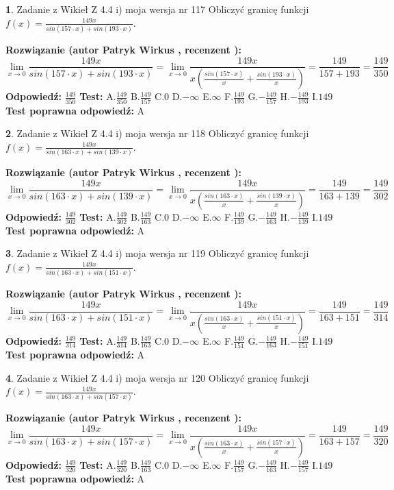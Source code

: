 \documentclass[12pt, a4paper]{article}
\theoremstyle{definition} %
\newtheorem{zad}{}
\newcommand{\zadStart}[1]{\begin{zad}#1\newline}
\newcommand{\zadStop}{\end{zad}}
\newcommand{\rozwStart}[2]{\noindent \textbf{Rozwiązanie (autor #1 , recenzent #2): }\newline}
\newcommand{\rozwStop}{\newline}
\newcommand{\odpStart}{\noindent \textbf{Odpowiedź:}\newline}
\newcommand{\odpStop}{\newline}
\newcommand{\testStart}{\noindent \textbf{Test:}\newline}
\newcommand{\testStop}{\newline}
\newcommand{\kluczStart}{\noindent \textbf{Test poprawna odpowiedź:}\newline}
\newcommand{\kluczStop}{\newline}
\begin{document}
\zadStart{Zadanie z Wikieł Z 4.4 i) moja wersja nr 117}
Obliczyć granicę funkcji $f(x)=\frac{149x}{sin(157\cdot x) +sin(193\cdot x)}$.
\zadStop
\rozwStart{Patryk Wirkus}{}
$$\lim\limits_{x\to 0}\frac{149x}{sin(157\cdot x) +sin(193\cdot x)}=\lim\limits_{x\to 0}\frac{149x}{x(\frac{sin(157\cdot x)}{x}+\frac{sin(193\cdot x)}{x})}=\frac{149}{157+193} = \frac{149}{350}$$
\rozwStop
\odpStart
$\frac{149}{350}$
\odpStop
\testStart
A.$\frac{149}{350}$
B.$\frac{149}{157}$
C.$0$
D.$-\infty$
E.$\infty$
F.$\frac{149}{193}$
G.$-\frac{149}{157}$
H.$-\frac{149}{193}$
I.$149$
\testStop
\kluczStart
A
\kluczStop



\zadStart{Zadanie z Wikieł Z 4.4 i) moja wersja nr 118}
Obliczyć granicę funkcji $f(x)=\frac{149x}{sin(163\cdot x) +sin(139\cdot x)}$.
\zadStop
\rozwStart{Patryk Wirkus}{}
$$\lim\limits_{x\to 0}\frac{149x}{sin(163\cdot x) +sin(139\cdot x)}=\lim\limits_{x\to 0}\frac{149x}{x(\frac{sin(163\cdot x)}{x}+\frac{sin(139\cdot x)}{x})}=\frac{149}{163+139} = \frac{149}{302}$$
\rozwStop
\odpStart
$\frac{149}{302}$
\odpStop
\testStart
A.$\frac{149}{302}$
B.$\frac{149}{163}$
C.$0$
D.$-\infty$
E.$\infty$
F.$\frac{149}{139}$
G.$-\frac{149}{163}$
H.$-\frac{149}{139}$
I.$149$
\testStop
\kluczStart
A
\kluczStop



\zadStart{Zadanie z Wikieł Z 4.4 i) moja wersja nr 119}
Obliczyć granicę funkcji $f(x)=\frac{149x}{sin(163\cdot x) +sin(151\cdot x)}$.
\zadStop
\rozwStart{Patryk Wirkus}{}
$$\lim\limits_{x\to 0}\frac{149x}{sin(163\cdot x) +sin(151\cdot x)}=\lim\limits_{x\to 0}\frac{149x}{x(\frac{sin(163\cdot x)}{x}+\frac{sin(151\cdot x)}{x})}=\frac{149}{163+151} = \frac{149}{314}$$
\rozwStop
\odpStart
$\frac{149}{314}$
\odpStop
\testStart
A.$\frac{149}{314}$
B.$\frac{149}{163}$
C.$0$
D.$-\infty$
E.$\infty$
F.$\frac{149}{151}$
G.$-\frac{149}{163}$
H.$-\frac{149}{151}$
I.$149$
\testStop
\kluczStart
A
\kluczStop



\zadStart{Zadanie z Wikieł Z 4.4 i) moja wersja nr 120}
Obliczyć granicę funkcji $f(x)=\frac{149x}{sin(163\cdot x) +sin(157\cdot x)}$.
\zadStop
\rozwStart{Patryk Wirkus}{}
$$\lim\limits_{x\to 0}\frac{149x}{sin(163\cdot x) +sin(157\cdot x)}=\lim\limits_{x\to 0}\frac{149x}{x(\frac{sin(163\cdot x)}{x}+\frac{sin(157\cdot x)}{x})}=\frac{149}{163+157} = \frac{149}{320}$$
\rozwStop
\odpStart
$\frac{149}{320}$
\odpStop
\testStart
A.$\frac{149}{320}$
B.$\frac{149}{163}$
C.$0$
D.$-\infty$
E.$\infty$
F.$\frac{149}{157}$
G.$-\frac{149}{163}$
H.$-\frac{149}{157}$
I.$149$
\testStop
\kluczStart
A
\kluczStop
\end{document}
